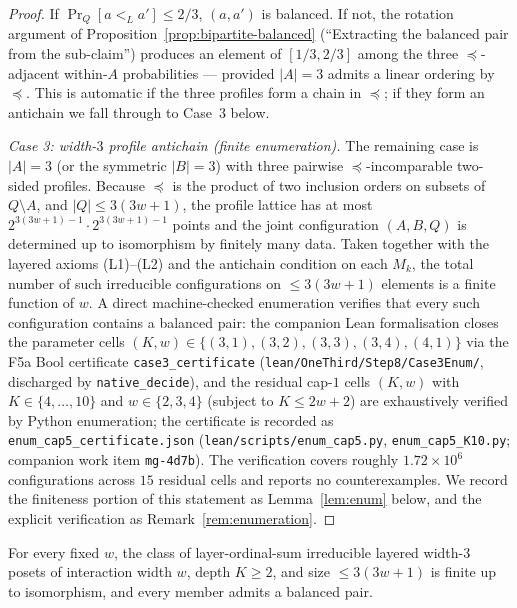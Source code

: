 \begin{proof}
If $\Pr_Q[a <_L a'] \le 2/3$, $(a, a')$ is balanced. If not, the
rotation argument of Proposition~\ref{prop:bipartite-balanced}
(``Extracting the balanced pair from the sub-claim'')
produces an element of $[1/3, 2/3]$ among the three
$\preceq$-adjacent within-$A$ probabilities --- provided $|A| = 3$
admits a linear ordering by $\preceq$. This is automatic if the three
profiles form a chain in $\preceq$; if they form an antichain we fall
through to Case~3 below.

\medskip\noindent\emph{Case 3: width-$3$ profile antichain (finite
enumeration).} The remaining case is $|A| = 3$ (or the symmetric
$|B| = 3$) with three pairwise $\preceq$-incomparable two-sided
profiles. Because $\preceq$ is the product of two inclusion orders on
subsets of $Q \setminus A$, and $|Q| \le 3(3w+1)$, the profile lattice
has at most $2^{3(3w+1) - 1} \cdot 2^{3(3w+1) - 1}$ points and the
joint configuration $(A, B, Q)$ is determined up to isomorphism by
finitely many data. Taken together with the layered axioms (L1)--(L2)
and the antichain condition on each $M_k$, the total number of such
irreducible configurations on $\le 3(3w+1)$ elements is a finite
function of $w$. A direct machine-checked enumeration verifies
that every such configuration contains a balanced pair: the
companion Lean formalisation closes the parameter cells
$(K, w) \in \{(3,1), (3,2), (3,3), (3,4), (4,1)\}$ via the F5a Bool
certificate \texttt{case3\_certificate}
(\texttt{lean/OneThird/Step8/Case3Enum/}, discharged by
\texttt{native\_decide}), and the residual cap-$1$ cells
$(K, w)$ with $K \in \{4, \ldots, 10\}$ and $w \in \{2, 3, 4\}$
(subject to $K \le 2w + 2$) are exhaustively verified by Python
enumeration; the certificate is recorded as
\texttt{enum\_cap5\_certificate.json}
(\texttt{lean/scripts/enum\_cap5.py}, \texttt{enum\_cap5\_K10.py};
companion work item \texttt{mg-4d7b}). The verification covers
roughly $1.72\times 10^6$ configurations across $15$ residual cells
and reports no counterexamples. We record the finiteness portion of
this statement as Lemma~\ref{lem:enum} below, and the explicit
verification as Remark~\ref{rem:enumeration}.
\end{proof}

\begin{lemma}\label{lem:enum}
For every fixed $w$, the class of layer-ordinal-sum irreducible
layered width-$3$ posets of interaction width $w$, depth $K \ge 2$,
and size $\le 3(3w+1)$ is finite up to isomorphism, and every member
admits a balanced pair.
\end{lemma}

